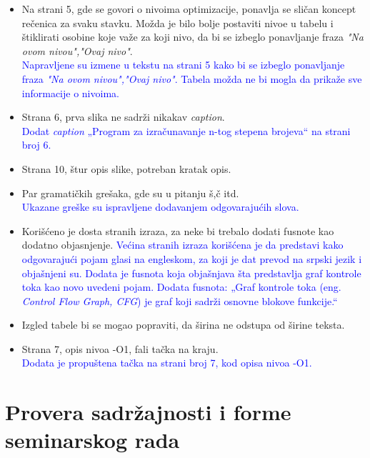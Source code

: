 \documentclass[a4paper]{report}
\newcommand{\odgovor}[1]{\textcolor{blue}{#1}}
\begin{document}
\begin{itemize}
    \item Na strani 5, gde se govori o nivoima optimizacije, ponavlja se sličan koncept rečenica za svaku stavku. Možda je bilo bolje postaviti nivoe u tabelu i štiklirati osobine koje važe za koji nivo, da bi se izbeglo ponavljanje fraza \textit{"Na ovom nivou","Ovaj nivo"}. \\
          \odgovor{Napravljene su izmene u tekstu na strani 5 kako bi se izbeglo ponavljanje fraza \textit{"Na ovom nivou","Ovaj nivo"}. Tabela možda ne bi mogla da prikaže sve informacije o nivoima.}
    \item Strana 6, prva slika ne sadrži nikakav \textit{caption}. \\
         \odgovor{Dodat \textit{caption} „Program za izračunavanje n-tog stepena brojeva“ na strani broj 6.}
    \item Strana 10, štur opis slike, potreban kratak opis.
    \item Par gramatičkih grešaka, gde su u pitanju š,č itd. \\
         \odgovor{Ukazane greške su ispravljene dodavanjem odgovarajućih slova.}
    \item Korišćeno je dosta stranih izraza, za neke bi trebalo dodati fusnote kao dodatno objasnjenje.
          \odgovor{Većina stranih izraza korišćena je da predstavi kako odgovarajući pojam glasi na engleskom, za koji je dat prevod na srpski jezik i objašnjeni su.
                   Dodata je fusnota koja objašnjava šta predstavlja graf kontrole toka kao novo uvedeni pojam.
                   Dodata fusnota: „Graf kontrole toka (eng. ~ {\em Control Flow Graph, CFG}) je graf koji sadrži osnovne blokove funkcije.“
          }
    \item Izgled tabele bi se mogao popraviti, da širina ne odstupa od širine teksta.
    \item Strana 7, opis nivoa -O1, fali tačka na kraju. \\
         \odgovor{Dodata je propuštena tačka na strani broj 7, kod opisa nivoa -O1.}
    
\end{itemize}


\section{Provera sadržajnosti i forme seminarskog rada}
\end{document}

